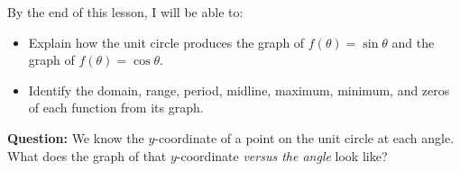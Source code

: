 \documentclass[10pt]{article}
\begin{document}
\namedateperiod

\vspace{0.1in}

\begin{objectivebox}
By the end of this lesson, I will be able to:
\begin{itemize}[leftmargin=1.5em, itemsep=4pt]
    \item Explain how the unit circle produces the graph of $f(\theta)=\sin\theta$ and
          the graph of $f(\theta)=\cos\theta$. \writeline
    \item Identify the domain, range, period, midline, maximum, minimum, and zeros of
          each function from its graph. \writeline
\end{itemize}
\end{objectivebox}

\vspace{0.1in}

\begin{vocabbox}
\end{vocabbox}

\vspace{0.1in}

\begin{hookbox}
\textbf{Question:} We know the $y$-coordinate of a point on the unit circle at each angle.
What does the graph of that $y$-coordinate \emph{versus the angle} look like?

\vspace{0.06in}
\end{hookbox}

\vspace{0.1in}
\end{document}
